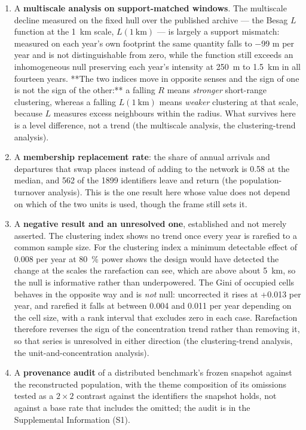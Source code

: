 \documentclass[fleqn,10pt,lineno]{wlpeerj}
\newcommand{\replMedian}{0.58}
\newcommand{\rRareMDE}{0.008}
\newcommand{\gfGiniSlope}{+0.013}
\begin{document}
\begin{enumerate}
(the co-location analysis).
\item A \textbf{multiscale analysis on support-matched windows}. The multiscale decline measured
on the fixed hull over the published archive --- the Besag $L$ function \citep{besag1977simple} at the
\SI{1}{\kilo\meter} scale, $L(\SI{1}{\kilo\meter})$ --- is largely a support mismatch: measured on
each year's own footprint the same quantity falls to
\num{-99} m per year and is not distinguishable from zero, while the function still exceeds an
inhomogeneous null preserving each year's intensity at \SI{250}{\meter} to
\SI{1.5}{\kilo\meter} in all fourteen years. **The two indices move in opposite senses and the
sign of one is not the sign of the other:** a falling $R$ means \emph{stronger} short-range
clustering, whereas a falling $L(\SI{1}{\kilo\meter})$ means \emph{weaker} clustering at that
scale, because $L$ measures excess neighbours within the radius. What survives here is a level
difference, not a trend
(the multiscale analysis, the clustering-trend analysis).
\item A \textbf{membership replacement rate}: the share of annual arrivals and departures that
swap places instead of adding to the network is \replMedian{} at the median, and
\num{562} of the \num{1899} identifiers leave and return
(the population-turnover analysis). This is the one result here whose value does not depend
on which of the two units is used, though the frame still sets it.
\item A \textbf{negative result and an unresolved one}, established and not merely asserted.
The clustering index shows no trend once every year is rarefied to a common
sample size. For the clustering index a minimum detectable effect of \rRareMDE{} per year at
\SI{80}{\percent} power shows the design would have detected the change at the scales the
rarefaction can see, which are above about \SI{5}{\kilo\meter}, so the null is informative rather
than underpowered. The Gini of occupied cells behaves in the opposite way and is \emph{not}
null: uncorrected it rises at \gfGiniSlope{} per year, and rarefied it falls at between
\num{0.004} and \num{0.011} per year depending on the cell size, with a rank interval that
excludes zero in each case. Rarefaction therefore reverses the sign of the concentration trend
rather than removing it, so that series is unresolved in either direction
(the clustering-trend analysis, the unit-and-concentration analysis).
\item A \textbf{provenance audit} of a distributed benchmark's frozen snapshot against the
reconstructed population, with the theme composition of its omissions tested as a $2\times2$
contrast against the identifiers the snapshot holds, not against a base rate that includes the
omitted; the audit is in the Supplemental Information (S1).
\end{enumerate}
\end{document}
